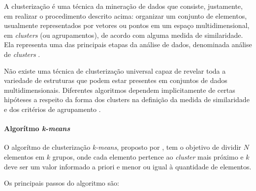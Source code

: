 A clusterização é uma técnica da mineração de dados que consiste, justamente, em realizar o procedimento descrito acima: organizar um conjunto de elementos, usualmente representados por vetores ou pontos em um espaço multidimensional, em \textit{clusters} (ou agrupamentos), de acordo com alguma medida de similaridade. Ela representa uma das principais etapas da análise de dados, denominada análise de \textit{clusters} \cite{jain1999}.

Não existe uma técnica de clusterização universal capaz de revelar toda a variedade de estruturas que podem estar presentes em conjuntos de dados multidimensionais. Diferentes algoritmos dependem implicitamente de certas hipóteses a respeito da forma dos clusters na definição da medida de similaridade e dos critérios de agrupamento \cite{estivill2002}.

\paragraph{Algorítmo \textit{k-means}}
\label{sub:k_means}

O algorítmo de clusterização \textit{k-means}, proposto por , tem o objetivo de dividir \(N\) elementos em \(k\) grupos, onde cada elemento pertence ao \textit{cluster} mais próximo e \(k\) deve ser um valor informado a priori e menor ou igual à quantidade de elementos.

Os principais passos do algoritmo são:

